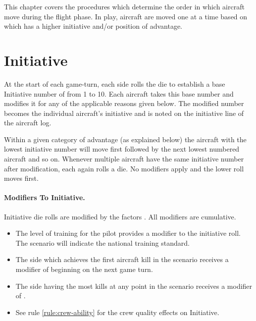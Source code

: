 
\label{rule:order-of-flight}

This chapter covers the procedures which determine the order in which aircraft move during the flight phase. In play, aircraft are moved one at a time based on which has a higher initiative and/or position of advantage.

\section{Initiative}
\label{rule:initiative}


At the start of each game-turn, each side rolls the die to establish a base Initiative number of from 1 to 10. Each aircraft takes this base number and modifies it for any of the applicable reasons given below. The modified number becomes the individual aircraft's initiative and is noted on the initiative line of the aircraft log.

Within a given category of advantage (as explained below) the aircraft with the lowest initiative number will move first followed by the next lowest numbered aircraft and so on. Whenever multiple aircraft have the same initiative number after modification, each again rolls a die. No modifiers apply and the lower roll moves first.

\paragraph{Modifiers To Initiative.} Initiative die rolls are modified by the factors . All modifiers are cumulative.


\begin{itemize}

    \item{} The level of training for the pilot provides a modifier to the initiative roll. The scenario will indicate the national training standard.

    \item{} The side which achieves the first aircraft kill in the scenario receives a modifier of  beginning on the next game turn.

    \item{} The side having the most kills at any point in the scenario receives a modifier of .

    \item{} See rule \ref{rule:crew-ability} for the crew quality effects on Initiative.
\end{itemize}




